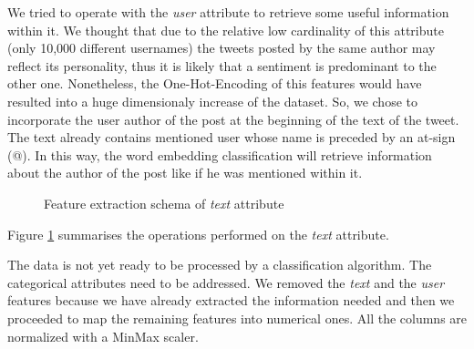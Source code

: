 \documentclass[conference]{IEEEtran}
\begin{document}
We tried to operate with the \textit{user} attribute to retrieve some useful information within it. We thought that due to the relative low cardinality of this attribute (only 10,000 different usernames) the tweets posted by the same author may reflect its personality, thus it is likely that a sentiment is predominant to the other one. Nonetheless, the One-Hot-Encoding\cite{ohe} of this features would have resulted into a huge dimensionaly increase of the dataset. So, we chose to incorporate the user author of the post at the beginning of the text of the tweet. The text already contains mentioned user whose name is preceded by an at-sign (@). In this way, the word embedding classification will retrieve information about the author of the post like if he was mentioned within it.
\begin{figure}[h]
        \centering
        
        \caption{Feature extraction schema of \textit{text} attribute}
        \label{fig:text_schema}
\end{figure}

Figure \ref{fig:text_schema} summarises the operations performed on the \textit{text} attribute.

The data is not yet ready to be processed by a classification algorithm. The categorical attributes need to be addressed. We removed the \textit{text} and the \textit{user} features because we have already extracted the information needed and then we proceeded to map the remaining features into numerical ones. All the columns are normalized with a MinMax scaler\cite{minmax}.
\end{document}
